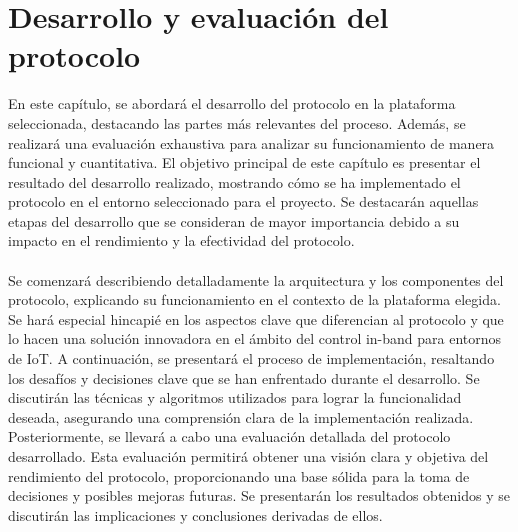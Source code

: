 \chapter{Desarrollo y evaluación del protocolo}
\label{desarrollo}

En este capítulo, se abordará el desarrollo del protocolo en la plataforma seleccionada, destacando las partes más relevantes del proceso. Además, se realizará una evaluación exhaustiva para analizar su funcionamiento de manera funcional y cuantitativa. El objetivo principal de este capítulo es presentar el resultado del desarrollo realizado, mostrando cómo se ha implementado el protocolo en el entorno seleccionado para el proyecto. Se destacarán aquellas etapas del desarrollo que se consideran de mayor importancia debido a su impacto en el rendimiento y la efectividad del protocolo.\\
\\
Se comenzará describiendo detalladamente la arquitectura y los componentes del protocolo, explicando su funcionamiento en el contexto de la plataforma elegida. Se hará especial hincapié en los aspectos clave que diferencian al protocolo y que lo hacen una solución innovadora en el ámbito del control in-band para entornos de IoT. A continuación, se presentará el proceso de implementación, resaltando los desafíos y decisiones clave que se han enfrentado durante el desarrollo. Se discutirán las técnicas y algoritmos utilizados para lograr la funcionalidad deseada, asegurando una comprensión clara de la implementación realizada. Posteriormente, se llevará a cabo una evaluación detallada del protocolo desarrollado. Esta evaluación permitirá obtener una visión clara y objetiva del rendimiento del protocolo, proporcionando una base sólida para la toma de decisiones y posibles mejoras futuras. Se presentarán los resultados obtenidos y se discutirán las implicaciones y conclusiones derivadas de ellos.









